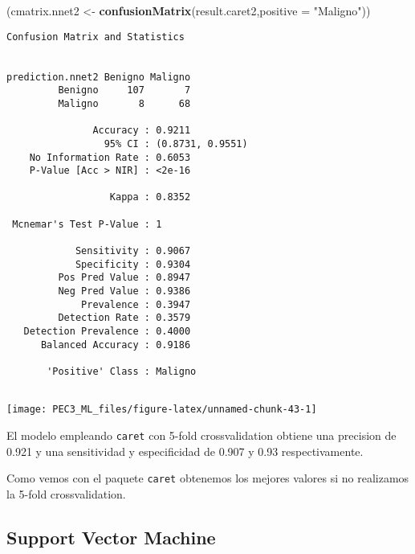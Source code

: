 \documentclass[
]{article}
\newenvironment{Shaded}{\begin{snugshade}}{\end{snugshade}}
\newcommand{\DataTypeTok}[1]{\textcolor[rgb]{0.13,0.29,0.53}{#1}}
\newcommand{\KeywordTok}[1]{\textcolor[rgb]{0.13,0.29,0.53}{\textbf{#1}}}
\newcommand{\NormalTok}[1]{#1}
\newcommand{\StringTok}[1]{\textcolor[rgb]{0.31,0.60,0.02}{#1}}
\begin{document}
\begin{Shaded}
\begin{Highlighting}[]
\NormalTok{(cmatrix.nnet2 <-}\StringTok{ }\KeywordTok{confusionMatrix}\NormalTok{(result.caret2,}\DataTypeTok{positive =} \StringTok{"Maligno"}\NormalTok{))}
\end{Highlighting}
\end{Shaded}

\begin{verbatim}
Confusion Matrix and Statistics

                
prediction.nnet2 Benigno Maligno
         Benigno     107       7
         Maligno       8      68
                                          
               Accuracy : 0.9211          
                 95% CI : (0.8731, 0.9551)
    No Information Rate : 0.6053          
    P-Value [Acc > NIR] : <2e-16          
                                          
                  Kappa : 0.8352          
                                          
 Mcnemar's Test P-Value : 1               
                                          
            Sensitivity : 0.9067          
            Specificity : 0.9304          
         Pos Pred Value : 0.8947          
         Neg Pred Value : 0.9386          
             Prevalence : 0.3947          
         Detection Rate : 0.3579          
   Detection Prevalence : 0.4000          
      Balanced Accuracy : 0.9186          
                                          
       'Positive' Class : Maligno         
                                          
\end{verbatim}

\begin{center}\texttt{[image: PEC3\_ML\_files/figure-latex/unnamed-chunk-43-1]} \end{center}

El modelo empleando \texttt{caret} con 5-fold crossvalidation obtiene
una precision de 0.921 y una sensitividad y especificidad de 0.907 y
0.93 respectivamente.

Como vemos con el paquete \texttt{caret} obtenemos los mejores valores
si no realizamos la 5-fold crossvalidation.

\hypertarget{support-vector-machine}{%
\subsection{Support Vector Machine}\label{support-vector-machine}}
\end{document}
